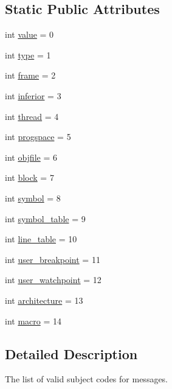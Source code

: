 \subsection*{Static Public Attributes}
\begin{DoxyCompactItemize}
\item 
int \hyperlink{classcommunication_1_1Subject_a03b6acd0ec2293b7d3ca0730f33825fc}{value} = 0
\item 
int \hyperlink{classcommunication_1_1Subject_a2b0a19b587eedf252e060644e25335ad}{type} = 1
\item 
int \hyperlink{classcommunication_1_1Subject_ae2ddaf6ef77f053f68432420b1044402}{frame} = 2
\item 
int \hyperlink{classcommunication_1_1Subject_ad4720f1f960a09acb9a0f245ac678cef}{inferior} = 3
\item 
int \hyperlink{classcommunication_1_1Subject_a1528e4403b2d635be7f0b75996ef9eeb}{thread} = 4
\item 
int \hyperlink{classcommunication_1_1Subject_a81b95c05fa8127686bacda56d9f814df}{progspace} = 5
\item 
int \hyperlink{classcommunication_1_1Subject_afc18bbd6bdad22358b66e6a165299ffb}{objfile} = 6
\item 
int \hyperlink{classcommunication_1_1Subject_afef993cc391a8771731201d3a7ce29a1}{block} = 7
\item 
int \hyperlink{classcommunication_1_1Subject_a5a99f69a3182112730b6176bd7dfa21b}{symbol} = 8
\item 
int \hyperlink{classcommunication_1_1Subject_a2fdd8fb0e4c0f8d02ad11f3094f56480}{symbol\+\_\+table} = 9
\item 
int \hyperlink{classcommunication_1_1Subject_a78892a277ffa04513a6979b5a0ade608}{line\+\_\+table} = 10
\item 
int \hyperlink{classcommunication_1_1Subject_aabef6ff24a331e2af1ba5c937f137f1d}{user\+\_\+breakpoint} = 11
\item 
int \hyperlink{classcommunication_1_1Subject_a73c6626ee68ebdc7f9eacd1065d499e6}{user\+\_\+watchpoint} = 12
\item 
int \hyperlink{classcommunication_1_1Subject_a6954f1d0226c57804d26c65220298907}{architecture} = 13
\item 
int \hyperlink{classcommunication_1_1Subject_a8d276dea7a38b2cd749e968b41b00cd9}{macro} = 14
\end{DoxyCompactItemize}


\subsection{Detailed Description}
\begin{DoxyVerb}The list of valid subject codes for messages.
\end{DoxyVerb}
 

